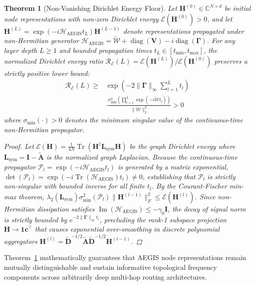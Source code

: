\documentclass[10pt,twocolumn,letterpaper]{article}
\newtheorem{theorem}{Theorem}
\begin{document}
\begin{theorem}[Non-Vanishing Dirichlet Energy Floor]
\label{thm:dirichlet_conservation}
Let $\mathbf{H}^{(0)} \in \mathbb{C}^{N \times d}$ be initial node representations with non-zero Dirichlet energy $\mathcal{E}(\mathbf{H}^{(0)}) > 0$, and let $\mathbf{H}^{(L)} = \exp(-i \mathcal{H}_{\text{AEGIS}} t_L) \mathbf{H}^{(L-1)}$ denote representations propagated under non-Hermitian generator $\mathcal{H}_{\text{AEGIS}} = \tilde{\mathcal{W}} + \operatorname{diag}(\mathbf{V}) - i\operatorname{diag}(\boldsymbol{\Gamma})$. For any layer depth $L \ge 1$ and bounded propagation times $t_L \in [t_{\min}, t_{\max}]$, the normalized Dirichlet energy ratio $\mathcal{R}_{\mathcal{E}}(L) = \mathcal{E}(\mathbf{H}^{(L)}) / \mathcal{E}(\mathbf{H}^{(0)})$ preserves a strictly positive lower bound:
\begin{equation}
\begin{split}
\mathcal{R}_{\mathcal{E}}(L) \ge{} & \exp\left(-2 \|\boldsymbol{\Gamma}\|_\infty \sum_{l=1}^L t_l\right) \\
& \cdot \frac{\sigma_{\min}^2\left(\prod_{l=1}^L \exp(-i \tilde{\mathcal{W}} t_l)\right)}{\|\tilde{\mathcal{W}}\|_2^2} > 0
\end{split}
\end{equation}
where $\sigma_{\min}(\cdot) > 0$ denotes the minimum singular value of the continuous-time non-Hermitian propagator.
\begin{proof}
Let $\mathcal{E}(\mathbf{H}) = \frac{1}{4N} \operatorname{Tr}(\mathbf{H}^\dagger \mathbf{L}_{\text{sym}} \mathbf{H})$ be the graph Dirichlet energy where $\mathbf{L}_{\text{sym}} = \mathbf{I} - \tilde{\mathbf{A}}$ is the normalized graph Laplacian. Because the continuous-time propagator $\mathcal{P}_l = \exp(-i \mathcal{H}_{\text{AEGIS}} t_l)$ is generated by a matrix exponential, $\det(\mathcal{P}_l) = \exp(-i \operatorname{Tr}(\mathcal{H}_{\text{AEGIS}}) t_l) \ne 0$, establishing that $\mathcal{P}_l$ is strictly non-singular with bounded inverse for all finite $t_l$. By the Courant-Fischer min-max theorem, $\lambda_2(\mathbf{L}_{\text{sym}}) \sigma_{\min}^2(\mathcal{P}_l) \|\mathbf{H}^{(l-1)}\|_F^2 \le \mathcal{E}(\mathbf{H}^{(l)})$. Since non-Hermitian dissipation satisfies $\operatorname{Im}(\mathcal{H}_{\text{AEGIS}}) \le -\gamma_0 \mathbf{I}$, the decay of signal norm is strictly bounded by $e^{-2 \|\boldsymbol{\Gamma}\|_\infty t_l}$, precluding the rank-1 subspace projection $\mathbf{H} \to \mathbf{1} \mathbf{c}^\top$ that causes exponential over-smoothing in discrete polynomial aggregators $\mathbf{H}^{(l)} = \tilde{\mathbf{D}}^{-1/2}\tilde{\mathbf{A}}\tilde{\mathbf{D}}^{-1/2}\mathbf{H}^{(l-1)}$.
\end{proof}
\end{theorem}
Theorem~\ref{thm:dirichlet_conservation} mathematically guarantees that AEGIS node representations remain mutually distinguishable and sustain informative topological frequency components across arbitrarily deep multi-hop routing architectures.
\end{document}
